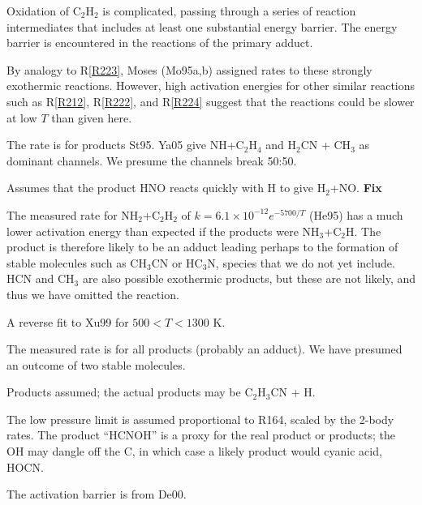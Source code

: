 \documentclass[12pt,landscape]{article}
\newcounter{reaction}
\begin{document}
  Oxidation of C$_2$H$_2$ is complicated, passing through a series of reaction intermediates that includes at least one substantial energy barrier.  The energy barrier is encountered in the reactions of the primary adduct.


   By analogy to R\ref{R223}, Moses (Mo95a,b) assigned rates to these strongly exothermic reactions. However, high activation energies for other similar reactions such as R\ref{R212}, R\ref{R222}, and R\ref{R224} suggest that the reactions could be slower at low $T$ than given here.
 
   The rate is for products St95. Ya05 give NH+C$_2$H$_4$ and H$_2$CN + CH$_3$ as dominant channels.  We presume the channels break 50:50.

 Assumes that the product HNO reacts quickly with H to give H$_2$+NO. {\bf Fix}

  The measured rate for NH$_2$+C$_2$H$_2$ of $k=6.1\!\times\! 10^{-12}e^{-5700/T}$ (He95) has a much lower activation energy than expected if the products were NH$_3$+C$_2$H.  The product is therefore likely to be an adduct
 leading perhaps to the formation of stable molecules such as CH$_3$CN or HC$_3$N, species that we do not yet include.
 HCN and CH$_3$ are also possible exothermic products, but these are not likely, and thus we have omitted the reaction.
 
  A reverse fit to Xu99 for $500<T<1300$ K.  

   The measured rate is for all products (probably an adduct).  We have presumed an outcome of two stable molecules.
 
    Products assumed; the actual products may be C$_2$H$_3$CN + H.

   The low pressure limit is assumed proportional to R164, scaled by the 2-body rates.  The product ``HCNOH'' is a proxy for the real product or products; the 
OH may dangle off the C, in which case a likely product would cyanic acid, HOCN. 

  The activation barrier is from De00.
\end{document}
